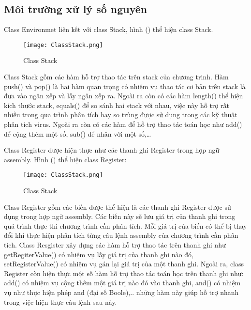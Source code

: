 		\newpage
	\subsection*{Môi trường xử lý số nguyên}
	Class Environmet liên kết với class Stack, hình () thể hiện class Stack.
		\begin{center}
			\begin{figure}[htp]
				\begin{center}
					\texttt{[image: ClassStack.png]}
				\end{center}
				\caption{Class Stack}	
					\label{fig:ClassStack}		
			\end{figure}
		\end{center}		
	
	Class Stack gồm các hàm hỗ trợ thao tác trên stack của chương trinh. Hàm push() và pop() là hai hàm quan trọng có nhiệm vụ thao tác cơ bản trên stack là đưa vào ngăn xếp và lấy ngăn xếp ra. Ngoài ra còn có các hàm length() thể hiện kích thước stack, equals() để so sánh hai stack với nhau, việc này hỗ trợ rất nhiều trong qua trình phân tích hay so trùng được sử dụng trong các kỹ thuật phân tích virus. Ngoài ra còn có các hàm để hỗ trợ thao tác toán học như add() để cộng thêm một số, sub() để nhân với một số,…
	
	\newpage
	Class Register được hiện thực như các thanh ghi Register trong hợp ngữ assembly. Hình () thể hiện class Register:
	\begin{center}
			\begin{figure}[htp]
				\begin{center}
					\texttt{[image: ClassStack.png]}
				\end{center}
				\caption{Class Stack}	
					\label{fig:ClassStack}		
			\end{figure}
		\end{center}		
		
		Class Register gồm các biến được thể hiện là các thanh ghi Register được sử dụng trong hợp ngữ assembly. Các biến này sẽ lưu giá trị của thanh ghi trong quá trình thực thi chương trình cần phân tích. Mỗi giá trị của biến có thể bị thay đổi khi thực hiện phân tích từng câu lệnh assembly của chương trình cần phân tích. Class Resgister xây dựng các hàm hỗ trợ thao tác trên thanh ghi như getRegiterValue() có nhiệm vụ lấy giá trị của thanh ghi nào đó, setRegisterValue() có nhiệm vụ gán lại giá trị của một thanh ghi. Ngoài ra, class Register còn hiện thực một số hàm hỗ trợ thao tác toán học trên thanh ghi như: add() có nhiệm vụ cộng thêm một giá trị nào đó vào thanh ghi, and() có nhiệm vụ như thực hiện phép and (đại số Boole),.. những hàm này giúp hỗ trợ nhanh trong việc hiện thực câu lệnh sau này.
		
